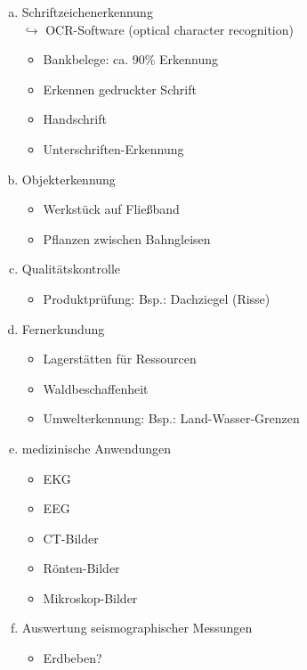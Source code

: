 \documentclass[a4paper,12pt]{scrreprt}
\begin{document}
  \begin{enumerate}[(a)]
   \item Schriftzeichenerkennung \\  $\hookrightarrow$ OCR-Software (optical character recognition)
     \begin{itemize}
   \item Bankbelege: ca. 90\% Erkennung
   \item Erkennen gedruckter Schrift
   \item Handschrift
   \item Unterschriften-Erkennung
  \end{itemize}

  \item Objekterkennung
  \begin{itemize}
   \item Werkstück auf Fließband
   \item Pflanzen zwischen Bahngleisen
  \end{itemize}
  
  \item Qualitätskontrolle
  \begin{itemize}
   \item Produktprüfung: Bsp.: Dachziegel (Risse)
  \end{itemize}
  
  \item Fernerkundung
  \begin{itemize}
   \item Lagerstätten für Ressourcen
   \item Waldbeschaffenheit
   \item Umwelterkennung: Bsp.: Land-Wasser-Grenzen
  \end{itemize}

 \item medizinische Anwendungen
  \begin{itemize}
   \item EKG
   \item EEG
   \item CT-Bilder
   \item Rönten-Bilder
   \item Mikroskop-Bilder
  \end{itemize}

  \item  Auswertung seismographischer Messungen
  \begin{itemize}
   \item Erdbeben?
  \end{itemize}
  

\end{enumerate}
\end{document}
